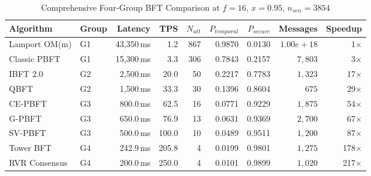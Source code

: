 \begin{table}[htbp]
\caption{Comprehensive Four-Group BFT Comparison at $f=16$, $x=0.95$, $n_{sen}=3854$}
\centering
\scriptsize
\begin{tabular}{@{}llrrrrrrr@{}}
\toprule
\textbf{Algorithm} & \textbf{Group} & \textbf{Latency} & \textbf{TPS} & \textbf{$N_{att}$} & \textbf{$P_{temporal}$} & \textbf{$P_{secure}$} & \textbf{Messages} & \textbf{Speedup} \\
\midrule
Lamport OM(m) & G1 & 43,350\,ms & 1.2 & 867 & 0.9870 & 0.0130 & $1.00e+18$ & 1$\times$ \\
Classic PBFT & G1 & 15,300\,ms & 3.3 & 306 & 0.7843 & 0.2157 & $7,803$ & 3$\times$ \\
\midrule
IBFT 2.0 & G2 & 2,500\,ms & 20.0 & 50 & 0.2217 & 0.7783 & $1,323$ & 17$\times$ \\
QBFT & G2 & 1,500\,ms & 33.3 & 30 & 0.1396 & 0.8604 & $675$ & 29$\times$ \\
\midrule
CE-PBFT & G3 & 800.0\,ms & 62.5 & 16 & 0.0771 & 0.9229 & $1,875$ & 54$\times$ \\
G-PBFT & G3 & 650.0\,ms & 76.9 & 13 & 0.0631 & 0.9369 & $2,700$ & 67$\times$ \\
SV-PBFT & G3 & 500.0\,ms & 100.0 & 10 & 0.0489 & 0.9511 & $1,200$ & 87$\times$ \\
\midrule
Tower BFT & G4 & 242.9\,ms & 205.8 & 4 & 0.0199 & 0.9801 & $1,275$ & 178$\times$ \\
RVR Consensus & G4 & 200.0\,ms & 250.0 & 4 & 0.0101 & 0.9899 & $1,020$ & 217$\times$ \\
\bottomrule
\end{tabular}
\end{table}